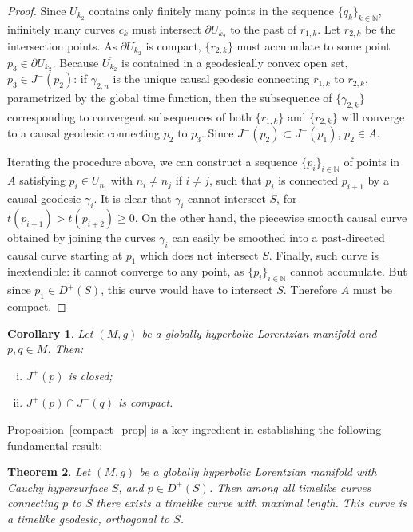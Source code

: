\documentclass[12pt]{amsart}
\newcommand{\bbN}{\mathbb{N}}      %
\newtheorem{Thm}{Theorem}[section]
\newtheorem{Cor}[Thm]{Corollary}
\theoremstyle{definition}
\theoremstyle{remark}
\begin{document}
\begin{proof}
Since $U_{k_2}$ contains only finitely many points in the sequence $\{ q_k \}_{k \in \bbN}$, infinitely many curves $c_k$ must intersect $\partial U_{k_2}$ to the past of $r_{1,k}$. Let $r_{2,k}$ be the intersection points. As $\partial U_{k_2}$ is compact, $\{r_{2,k}\}$ must accumulate to some point $p_3 \in \partial U_{k_2}$. Because $\overline{U_{k_2}}$ is contained in a geodesically convex open set, $p_3 \in J^-(p_2)$: if $\gamma_{2,n}$ is the unique causal geodesic connecting $r_{1,k}$ to $r_{2,k}$, parametrized by the global time function, then the subsequence of $\{\gamma_{2,k}\}$ corresponding to convergent subsequences of both $\{r_{1,k}\}$ and $\{r_{2,k}\}$ will converge to a causal geodesic connecting $p_2$ to $p_3$. Since $J^-(p_2) \subset J^-(p_1)$, $p_2 \in A$.

Iterating the procedure above, we can construct a sequence $\{p_i\}_{i\in\bbN}$ of points in $A$ satisfying $p_i \in U_{n_i}$ with $n_i \neq n_j$ if $i \neq j$, such that $p_{i}$ is connected $p_{i+1}$ by a causal geodesic $\gamma_i$. It is clear that $\gamma_i$ cannot intersect $S$, for $t(p_{i+1}) > t(p_{i+2}) \geq 0$. On the other hand, the piecewise smooth causal curve obtained by joining the curves $\gamma_i$ can easily be smoothed into a past-directed causal curve starting at $p_1$ which does not intersect $S$. Finally, such curve is inextendible: it cannot converge to any point, as $\{p_i\}_{i\in\bbN}$ cannot accumulate. But since $p_1 \in D^+(S)$, this curve would have to intersect $S$. Therefore $A$ must be compact.
\end{proof}

\begin{Cor}
Let $(M,g)$ be a globally hyperbolic Lorentzian manifold and $p,q \in M$. Then:
\begin{enumerate}[(i)]
\item
$J^+(p)$ is closed;
\item
$J^+(p) \cap J^-(q)$ is compact.
\end{enumerate}
\end{Cor}

Proposition~\ref{compact_prop} is a key ingredient in establishing the following fundamental result:

\begin{Thm} \label{max_thm}
Let $(M,g)$ be a globally hyperbolic Lorentzian manifold with Cauchy hypersurface $S$, and $p \in D^+(S)$. Then among all timelike curves connecting $p$ to $S$ there exists a timelike curve with maximal length. This curve is a timelike geodesic, orthogonal to $S$.
\end{Thm}
\end{document}
